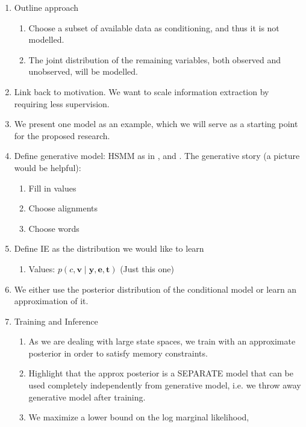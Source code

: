 \documentclass[12pt]{article}
\newcommand{\be}{\mathbf{e}}
\newcommand{\br}{\mathbf{r}}
\newcommand{\bt}{\mathbf{t}}
\newcommand{\bv}{\mathbf{v}}
\newcommand{\by}{\mathbf{y}}
\begin{document}
\begin{enumerate}
\begin{enumerate}
    \item Outline approach
        \begin{enumerate}
        \item Choose a subset of available data as conditioning,
            and thus it is not modelled.
        \item The joint distribution of the remaining variables,
            both observed and unobserved, will be modelled.
        \end{enumerate}
    \item Link back to motivation. We want to scale information extraction
        by requiring less supervision.
    \item We present one model as an example, which we will serve as
        a starting point for the proposed research.
    \item Define generative model: HSMM as in \citep{liang2009semalign},
        and \citep{wiseman2018template}.
        The generative story (a picture would be helpful):
        \begin{enumerate}
        \item Fill in values
        \item Choose alignments
        \item Choose words
        \end{enumerate}
    \item Define IE as the distribution we would like to learn
        \begin{enumerate}
        \item Values: $p(c,\bv\mid\by,\be,\bt)$ (Just this one)
        \end{enumerate}
    \item We either use the posterior distribution of the conditional model
        or learn an approximation of it.
    \item Training and Inference
        \begin{enumerate}
        \item As we are dealing with large state spaces,
            we train with an approximate posterior in order to satisfy memory constraints.
        \item Highlight that the approx posterior is a SEPARATE model
            that can be used completely independently from generative model,
            i.e. we throw away generative model after training.
        \item We maximize a lower bound on the log marginal likelihood,

\end{enumerate}
\end{enumerate}
\end{enumerate}
\end{document}
